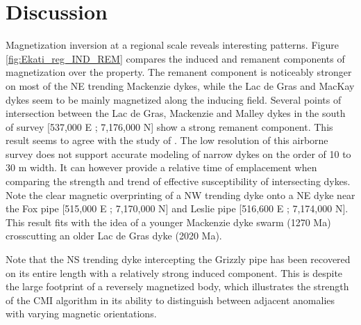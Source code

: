 \section{Discussion}
Magnetization inversion at a regional scale reveals interesting patterns.
Figure \ref{fig:Ekati_reg_IND_REM} compares the induced and remanent components of magnetization over the property.
The remanent component is noticeably stronger on most of the NE trending Mackenzie dykes, while the Lac de Gras and MacKay dykes seem to be mainly magnetized along the inducing field.
Several points of intersection between the Lac de Gras, Mackenzie and Malley dykes in the south of survey [537,000 E ; 7,176,000 N] show a strong remanent component.
This result seems to agree with the study of \cite{Buchan09}.
The low resolution of this airborne survey does not support accurate modeling of narrow dykes on the order of 10 to 30 m width.
It can however provide a relative time of emplacement when comparing the strength and trend of effective susceptibility of intersecting dykes.
Note the clear magnetic overprinting of a NW trending dyke onto a NE dyke near the Fox pipe [515,000 E ; 7,170,000 N] and Leslie pipe [516,600 E ; 7,174,000 N].
This result fits with the idea of a younger Mackenzie dyke swarm (1270 Ma) crosscutting an older Lac de Gras dyke (2020 Ma).

Note that the NS trending dyke intercepting the Grizzly pipe has been recovered on its entire length with a relatively strong induced component. This is despite the large footprint of a reversely magnetized body, which illustrates the strength of the CMI algorithm in its ability to distinguish between adjacent anomalies with varying magnetic orientations.


